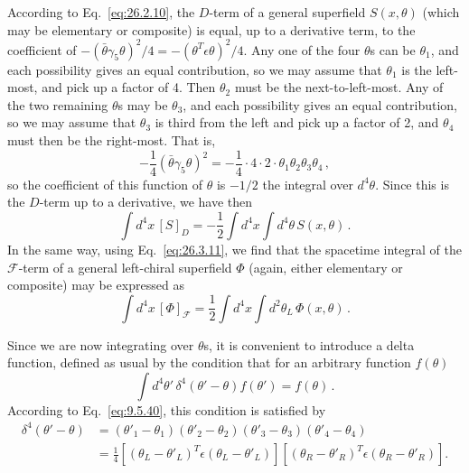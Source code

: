 According to Eq.~\eqref{eq:26.2.10}, the \(D\)-term of a general superfield
\(S(x,\theta)\) (which may be elementary or composite) is equal, up to a
derivative term, to the coefficient of
\(-(\bar\theta\gamma_5\theta)^2/4=-(\theta^T\epsilon\theta)^2/4\). Any one of
the four \(\theta\)s can be \(\theta_1\), and each possibility gives an equal
contribution, so we may assume that \(\theta_1\) is the left-most, and pick up
a factor of 4. Then \(\theta_2\) must be the next-to-left-most. Any of the two
remaining \(\theta\)s may be \(\theta_3\), and each possibility gives an equal
contribution, so we may assume that \(\theta_3\) is third from the left and
pick up a factor of 2, and \(\theta_4\) must then be the right-most. That is,
\[
  -\frac14(\bar\theta\gamma_5\theta)^2
  =-\frac14\cdot4\cdot2\cdot\theta_1\theta_2\theta_3\theta_4\,,
\]
so the coefficient of this function of \(\theta\) is \(-1/2\) the integral
over \(d^4\theta\). Since this is the \(D\)-term up to a derivative, we have
then
\begin{equation}
  \int d^4x\,[S]_D
  =-\frac12\int d^4x\int d^4\theta\,S(x,\theta)\,.
  \tag{26.6.5}\label{eq:26.6.5}
\end{equation}
In the same way, using Eq.~\eqref{eq:26.3.11}, we find that the spacetime
integral of the \(\mathcal{F}\)-term of a general left-chiral superfield
\(\Phi\) (again, either elementary or composite) may be expressed as
\begin{equation}
  \int d^4x\,[\Phi]_{\mathcal{F}}
  =\frac12\int d^4x\int d^2\theta_L\,\Phi(x,\theta)\,.
  \tag{26.6.6}\label{eq:26.6.6}
\end{equation}

Since we are now integrating over \(\theta\)s, it is convenient to introduce
a delta function, defined as usual by the condition that for an arbitrary
function \(f(\theta)\)
\begin{equation}
  \int d^4\theta'\,\delta^4(\theta'-\theta)f(\theta')=f(\theta)\,.
  \tag{26.6.7}\label{eq:26.6.7}
\end{equation}
According to Eq.~\eqref{eq:9.5.40}, this condition is satisfied by
\begin{equation}
  \begin{aligned}
  \delta^4(\theta'-\theta)
  &=(\theta'_1-\theta_1)(\theta'_2-\theta_2)
    (\theta'_3-\theta_3)(\theta'_4-\theta_4)
  \\
  &=\frac14
    \left[(\theta_L-\theta'_L)^T\epsilon(\theta_L-\theta'_L)\right]
    \left[(\theta_R-\theta'_R)^T\epsilon(\theta_R-\theta'_R)\right].
  \end{aligned}
  \tag{26.6.8}\label{eq:26.6.8}
\end{equation}

